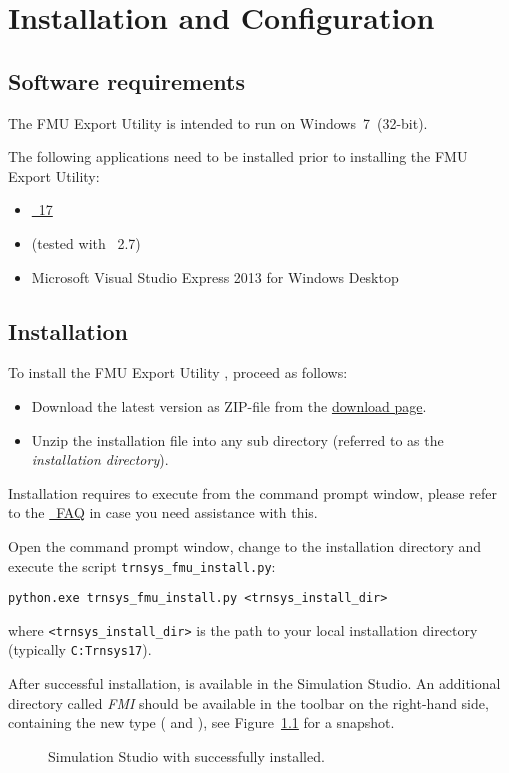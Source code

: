 \chapter{Installation and Configuration}

\section{Software requirements}

The \fmipp \trnsys FMU Export Utility is intended to run on Windows~7~(32-bit).

The following applications need to be installed prior to installing the \fmipp \trnsys FMU Export Utility:
\begin{itemize}
  \item \href{http://www.trnsys.com/}{\trnsys~17}
  \item \href{https://www.python.org/}{\python} (tested with \python~2.7)
  \item Microsoft Visual Studio Express 2013 for Windows Desktop
\end{itemize}


\section{Installation}
\label{sec:install}

To install the \fmipp \trnsys FMU Export Utility , proceed as follows:
\begin{itemize}
  \item Download the latest version as ZIP-file from the \href{http://sourceforge.net/projects/trnsys-fmu/files/latest/download}{download page}.
  \item Unzip the installation file into any sub directory (referred to as the \emph{installation directory}).
\end{itemize}

Installation requires to execute \python from the command prompt window, please refer to the \href{https://docs.python.org/2/faq/windows.html}{\python~FAQ} in case you need assistance with this.

Open the command prompt window, change to the installation directory and execute the script \texttt{trnsys\_fmu\_install.py}:
\begin{verbatim}
python.exe trnsys_fmu_install.py <trnsys_install_dir>
\end{verbatim}
where \texttt{<trnsys\_install\_dir>} is the path to your local \trnsys installation directory (typically \texttt{C:Trnsys17}).

After successful installation, \type is available in the \trnsys Simulation Studio. An additional directory called \emph{FMI} should be available in the toolbar on the right-hand side, containing the new \trnsys type (\emph{\typea} and \emph{\typeb}), see Figure~\ref{fig:simulation_studio_overview} for a snapshot.

\begin{figure}
\caption{Simulation Studio with \type successfully installed.}
\label{fig:simulation_studio_overview}
\end{figure}
